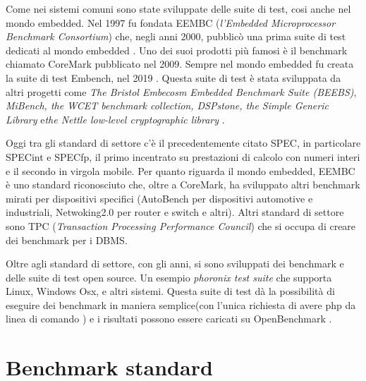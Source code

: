 \documentclass[12pt, a4paper]{report}
\begin{document}
 Come nei sistemi comuni sono state sviluppate delle suite di test, cosi anche nel mondo embedded. Nel 1997 fu fondata EEMBC (\textit{l'Embedded Microprocessor Benchmark Consortium}) che, negli anni 2000, pubblicò una prima suite di test dedicati al mondo embedded \cite{EEMBCSite}. %
 Uno dei suoi prodotti più famosi è il benchmark chiamato CoreMark pubblicato nel 2009. %
 Sempre nel mondo embedded fu creata la suite di test Embench, nel 2019 \cite{embenchSite}. Questa suite di test è stata sviluppata da altri progetti come \textit{The Bristol Embecosm Embedded Benchmark Suite (BEEBS)}, \textit{MiBench, the WCET benchmark collection, DSPstone, the Simple Generic Library} e\textit{the Nettle low-level cryptographic library}\cite{NettleSite}\cite{vittekBorovanskyMoreauTurin2006, }\cite{DSPStoneSite} \cite{WCETSite} \cite{MiBenchSite}. %
 
 Oggi tra gli standard di settore c'è il precedentemente citato SPEC, in particolare SPECint e SPECfp, il primo incentrato su prestazioni di calcolo con numeri interi e il secondo in virgola mobile. 
 Per quanto riguarda il mondo embedded, EEMBC è uno standard riconosciuto che, oltre a CoreMark, ha sviluppato altri benchmark mirati per dispositivi specifici (AutoBench per dispositivi automotive e industriali, Netwoking2.0 per router e switch e altri). %
 Altri standard di settore sono TPC (\textit{Transaction Processing Performance Council}) che si occupa di creare dei benchmark per i DBMS\cite{TPCSite}. %

 Oltre agli standard di settore, con gli anni, si sono sviluppati dei benchmark e delle suite di test open source. Un esempio \textit{phoronix test suite} \cite{ PhoronixTestSuiteSite}
 che supporta Linux, Windows Osx, e altri sistemi. Questa suite di test dà la possibilità di eseguire dei benchmark in maniera semplice(con l'unica richiesta di avere php da linea di comando ) e i risultati possono essere caricati su OpenBenchmark \cite{OpenBenchmarkSite}.



\section{Benchmark standard}
\end{document}
